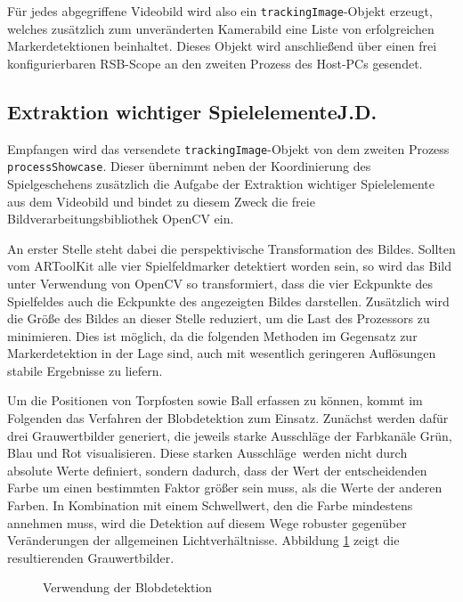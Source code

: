 Für jedes abgegriffene Videobild wird also ein \texttt{trackingImage}-Objekt erzeugt, welches zusätzlich zum unveränderten Kamerabild eine Liste von erfolgreichen Markerdetektionen beinhaltet. Dieses Objekt wird anschließend über einen frei konfigurierbaren RSB-Scope an den zweiten Prozess des Host-PCs gesendet.

\subsection[Extraktion wichtiger Spielelemente]{Extraktion wichtiger Spielelemente\hfill {\normalsize J.D.}} %

Empfangen wird das versendete \texttt{trackingImage}-Objekt von dem zweiten Prozess \texttt{processShowcase}. Dieser übernimmt neben der Koordinierung des Spielgeschehens zusätzlich die Aufgabe der Extraktion wichtiger Spielelemente aus dem Videobild und bindet zu diesem Zweck die freie Bildverarbeitungsbibliothek OpenCV ein.

An erster Stelle steht dabei die perspektivische Transformation des Bildes. Sollten vom ARToolKit alle vier Spielfeldmarker detektiert worden sein, so wird das Bild unter Verwendung von OpenCV so transformiert, dass die vier Eckpunkte des Spielfeldes auch die Eckpunkte des angezeigten Bildes darstellen. Zusätzlich wird die Größe des Bildes an dieser Stelle reduziert, um die Last des Prozessors zu minimieren. Dies ist möglich, da die folgenden Methoden im Gegensatz zur Markerdetektion in der Lage sind, auch mit wesentlich geringeren Auflösungen stabile Ergebnisse zu liefern.

Um die Positionen von Torpfosten sowie Ball erfassen zu können, kommt im Folgenden das Verfahren der Blobdetektion zum Einsatz. Zunächst werden dafür drei Grauwertbilder generiert, die jeweils starke Ausschläge der Farbkanäle Grün, Blau und Rot visualisieren. Diese \glqq starken Ausschläge\grqq~werden nicht durch absolute Werte definiert, sondern dadurch, dass der Wert der entscheidenden Farbe um einen bestimmten Faktor größer sein muss, als die Werte der anderen Farben. In Kombination mit einem Schwellwert, den die Farbe mindestens annehmen muss, wird die Detektion auf diesem Wege robuster gegenüber Veränderungen der allgemeinen Lichtverhältnisse. Abbildung \ref{fig:blob} zeigt die resultierenden Grauwertbilder.

\begin{figure}
	\begin{center}
		\caption{Verwendung der Blobdetektion}
		\label{fig:blob}
	\end{center}
\end{figure}

